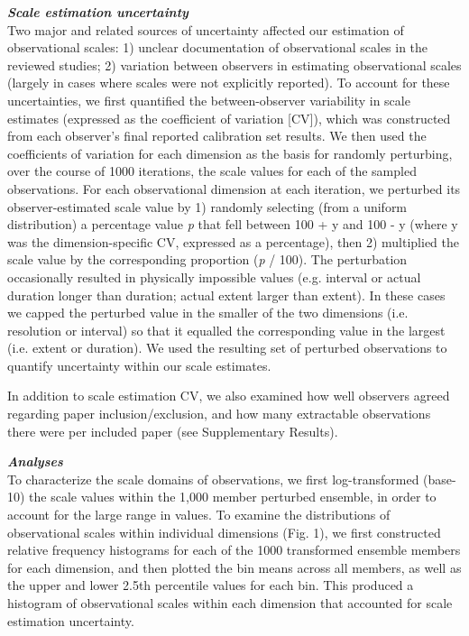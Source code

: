 \documentclass[12pt]{article}
\begin{document}
\vspace{5pt}
\noindent \textbf{\emph{Scale estimation uncertainty}}\\
Two major and related sources of uncertainty affected our estimation of observational scales: 1) unclear documentation of observational scales in the reviewed studies; 2) variation between observers in estimating observational scales (largely in cases where scales were not explicitly reported). To account for these uncertainties, we first quantified the between-observer variability in scale estimates (expressed as the coefficient of variation [CV]), which was constructed from each observer's final reported calibration set results. We then used the coefficients of variation for each dimension as the basis for randomly perturbing, over the course of 1000 iterations, the scale values for each of the sampled observations. For each observational dimension at each iteration, we perturbed its observer-estimated scale value by 1) randomly selecting (from a uniform distribution) a percentage value \emph{p} that fell between 100 + y and 100 - y (where y was the dimension-specific CV, expressed as a percentage), then 2) multiplied the scale value by the corresponding proportion (\emph{p} / 100). The perturbation occasionally resulted in physically impossible values (e.g. interval or actual duration longer than duration; actual extent larger than extent). In these cases we capped the perturbed value in the smaller of the two dimensions (i.e. resolution or interval) so that it equalled the corresponding value in the largest (i.e. extent or duration). We used the resulting set of perturbed observations to quantify uncertainty within our scale estimates. 

In addition to scale estimation CV, we also examined how well observers agreed regarding paper inclusion/exclusion, and how many extractable observations there were per included paper (see Supplementary Results). 

\vspace{5pt}
\noindent \textbf{\emph{Analyses}}\\
To characterize the scale domains of observations, we first log-transformed (base-10) the scale values within the 1,000 member perturbed ensemble, in order to account for the large range in values. To examine the distributions of observational scales within individual dimensions (Fig. 1), we first constructed relative frequency histograms for each of the 1000 transformed ensemble members for each dimension, and then plotted the bin means across all members, as well as the upper and lower 2.5th percentile values for each bin. This produced a histogram of observational scales within each dimension that accounted for scale estimation uncertainty. 
\end{document}
